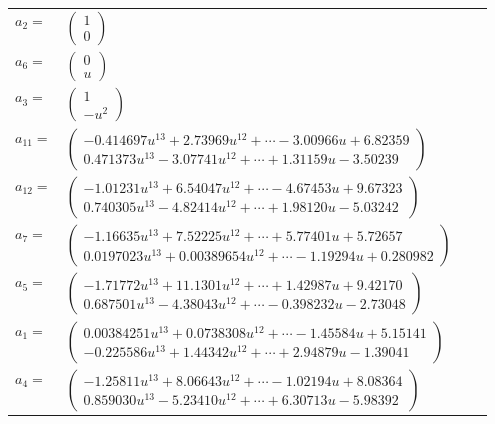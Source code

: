 \documentclass[1p]{elsarticle_modified}
\theoremstyle{definition}
\begin{document}
\begin{tabular}{m{7pt} m{180pt} m{7pt} m{180pt} }
\flushright $a_{2}=$&$\begin{pmatrix}1\\0\end{pmatrix}$ \\
\flushright $a_{6}=$&$\begin{pmatrix}0\\u\end{pmatrix}$ \\
\flushright $a_{3}=$&$\begin{pmatrix}1\\- u^2\end{pmatrix}$ \\
\flushright $a_{11}=$&$\begin{pmatrix}-0.414697 u^{13}+2.73969 u^{12}+\cdots-3.00966 u+6.82359\\0.471373 u^{13}-3.07741 u^{12}+\cdots+1.31159 u-3.50239\end{pmatrix}$ \\
\flushright $a_{12}=$&$\begin{pmatrix}-1.01231 u^{13}+6.54047 u^{12}+\cdots-4.67453 u+9.67323\\0.740305 u^{13}-4.82414 u^{12}+\cdots+1.98120 u-5.03242\end{pmatrix}$ \\
\flushright $a_{7}=$&$\begin{pmatrix}-1.16635 u^{13}+7.52225 u^{12}+\cdots+5.77401 u+5.72657\\0.0197023 u^{13}+0.00389654 u^{12}+\cdots-1.19294 u+0.280982\end{pmatrix}$ \\
\flushright $a_{5}=$&$\begin{pmatrix}-1.71772 u^{13}+11.1301 u^{12}+\cdots+1.42987 u+9.42170\\0.687501 u^{13}-4.38043 u^{12}+\cdots-0.398232 u-2.73048\end{pmatrix}$ \\
\flushright $a_{1}=$&$\begin{pmatrix}0.00384251 u^{13}+0.0738308 u^{12}+\cdots-1.45584 u+5.15141\\-0.225586 u^{13}+1.44342 u^{12}+\cdots+2.94879 u-1.39041\end{pmatrix}$ \\
\flushright $a_{4}=$&$\begin{pmatrix}-1.25811 u^{13}+8.06643 u^{12}+\cdots-1.02194 u+8.08364\\0.859030 u^{13}-5.23410 u^{12}+\cdots+6.30713 u-5.98392\end{pmatrix}$ \\

\end{tabular}
\end{document}
